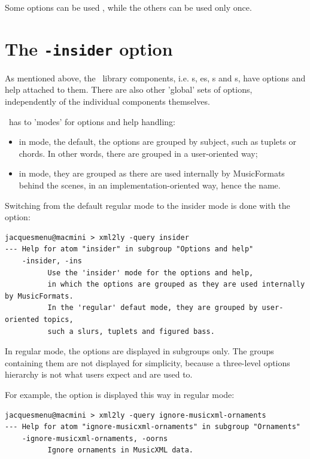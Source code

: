 Some options can be used , while the others can be used only once.

\section{The {\tt -insider} option}

As mentioned above, the \mf\ library components, i.e. \representation s, \pass es, \converter s and \generator s, have options and help attached to them. There are also other 'global' sets of options, independently of the individual components themselves.

\mf\ has to 'modes' for options and help handling:
\begin{itemize}
\item in  mode, the default, the options are grouped by subject, such as tuplets or chords. In other words, there are grouped in a user-oriented way;
\item in  mode, they are grouped as there are used internally by MusicFormats behind the scenes, in an implementation-oriented way, hence the name.
\end{itemize}

Switching from the default regular mode to the insider mode is done with the  option:
\begin{lstlisting}[language=Terminal]
jacquesmenu@macmini > xml2ly -query insider
--- Help for atom "insider" in subgroup "Options and help"
    -insider, -ins
          Use the 'insider' mode for the options and help,
          in which the options are grouped as they are used internally by MusicFormats.
          In the 'regular' defaut mode, they are grouped by user-oriented topics,
          such a slurs, tuplets and figured bass.
\end{lstlisting}

In regular mode, the options are displayed in subgroups only. The groups containing them are not displayed for simplicity, because a three-level options hierarchy is not what users expect and are used to.

For example, the  option is displayed this way in regular mode:
\begin{lstlisting}[language=Terminal]
jacquesmenu@macmini > xml2ly -query ignore-musicxml-ornaments
--- Help for atom "ignore-musicxml-ornaments" in subgroup "Ornaments"
    -ignore-musicxml-ornaments, -oorns
          Ignore ornaments in MusicXML data.
\end{lstlisting}

